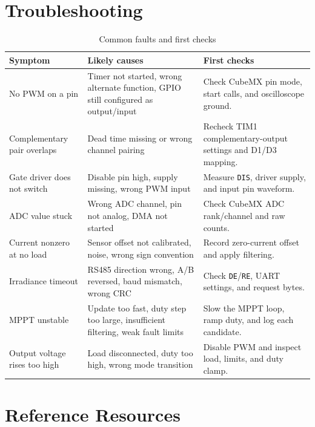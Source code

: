 \documentclass[11pt,a4paper]{article}
\newcommand{\code}[1]{\texttt{#1}}
\let\originalsection\section
\renewcommand{\section}{\clearpage\originalsection}
\begin{document}
\section{Troubleshooting}

\begin{table}[H]
  \centering
  \caption{Common faults and first checks}
  \label{tab:troubleshooting}
  \begin{tabularx}{\textwidth}{@{}L{0.24\textwidth} Y Y@{}}
    \toprule
    \textbf{Symptom} & \textbf{Likely causes} & \textbf{First checks} \\
    \midrule
    No PWM on a pin & Timer not started, wrong alternate function, GPIO still configured as output/input & Check CubeMX pin mode, start calls, and oscilloscope ground. \\
    Complementary pair overlaps & Dead time missing or wrong channel pairing & Recheck TIM1 complementary-output settings and D1/D3 mapping. \\
    Gate driver does not switch & Disable pin high, supply missing, wrong PWM input & Measure \code{DIS}, driver supply, and input pin waveform. \\
    ADC value stuck & Wrong ADC channel, pin not analog, DMA not started & Check CubeMX ADC rank/channel and raw counts. \\
    Current nonzero at no load & Sensor offset not calibrated, noise, wrong sign convention & Record zero-current offset and apply filtering. \\
    Irradiance timeout & RS485 direction wrong, A/B reversed, baud mismatch, wrong CRC & Check \code{DE}/\code{RE}, UART settings, and request bytes. \\
    MPPT unstable & Update too fast, duty step too large, insufficient filtering, weak fault limits & Slow the MPPT loop, ramp duty, and log each candidate. \\
    Output voltage rises too high & Load disconnected, duty too high, wrong mode transition & Disable PWM and inspect load, limits, and duty clamp. \\
    \bottomrule
  \end{tabularx}
\end{table}

\section{Reference Resources}
\label{sec:resources}
\end{document}
